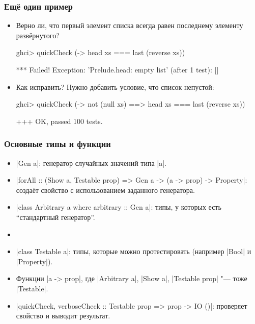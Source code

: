 \documentclass[11pt]{beamer}
\begin{document}
\begin{frame}[fragile]
  \frametitle{Ещё один пример}
  \begin{itemize}
    \item Верно ли, что первый элемент списка всегда равен последнему элементу развёрнутого?
          \begin{haskellsmall}
            ghci> quickCheck (\xs -> head xs === last (reverse xs))
          \end{haskellsmall}
          \pause
          \begin{ghcitiny}
            *** Failed! Exception: 'Prelude.head: empty list' (after 1 test):
            []
          \end{ghcitiny}
    \item Как исправить? \pause Нужно добавить условие, что список непустой:
          \begin{haskellsmall}
            ghci> quickCheck (\xs -> not (null xs) ==>
                    head xs === last (reverse xs))
          \end{haskellsmall}
          \pause
          \begin{ghcismall}
            +++ OK, passed 100 tests.
          \end{ghcismall}

  \end{itemize}
\end{frame}

\begin{frame}[fragile]
  \frametitle{Основные типы и функции}
  \begin{itemize}
    \item \haskinline|Gen a|: генератор случайных значений типа \haskinline|a|.
    \item \haskinline|forAll :: (Show a, Testable prop) => Gen a -> (a -> prop) -> Property|: создаёт свойство с использованием заданного генератора.
    \item \haskinline|class Arbitrary a where arbitrary :: Gen a|: типы, у которых есть \enquote{стандартный генератор}.
    \item[]
    \item \haskinline|class Testable a|: типы, которые можно протестировать (например \haskinline|Bool| и \haskinline|Property|).
    \item Функции \haskinline|a -> prop|, где \haskinline|Arbitrary a|, \haskinline|Show a|, \haskinline|Testable prop| "--- тоже \haskinline|Testable|.
    \item \haskinline|quickCheck, verboseCheck :: Testable prop => prop -> IO ()|: проверяет свойство и выводит результат.
  \end{itemize}
\end{frame}
\end{document}
